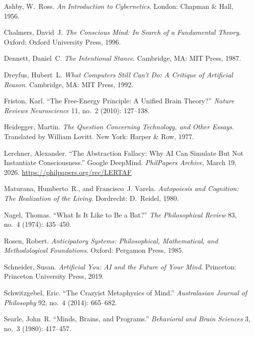 \documentclass[11pt]{article}
\theoremstyle{definition}
\theoremstyle{remark}
\begin{document}
{\setlength{\parskip}{4pt}\noindent
Ashby, W.~Ross. \textit{An Introduction to Cybernetics}. London: Chapman \& Hall, 1956.

\medskip\noindent
Chalmers, David~J. \textit{The Conscious Mind: In Search of a Fundamental Theory}. Oxford:
Oxford University Press, 1996.

\medskip\noindent
Dennett, Daniel~C. \textit{The Intentional Stance}. Cambridge, MA: MIT Press, 1987.

\medskip\noindent
Dreyfus, Hubert~L. \textit{What Computers Still Can't Do: A Critique of Artificial Reason}.
Cambridge, MA: MIT Press, 1992.

\medskip\noindent
Friston, Karl. ``The Free-Energy Principle: A Unified Brain Theory?'' \textit{Nature Reviews
Neuroscience} 11, no.~2 (2010): 127--138.

\medskip\noindent
Heidegger, Martin. \textit{The Question Concerning Technology, and Other Essays}. Translated
by William Lovitt. New York: Harper \& Row, 1977.

\medskip\noindent
Lerchner, Alexander. ``The Abstraction Fallacy: Why AI Can Simulate But Not Instantiate
Consciousness.'' Google DeepMind. \textit{PhilPapers Archive}, March 19, 2026.
\url{https://philpapers.org/rec/LERTAF}

\medskip\noindent
Maturana, Humberto~R., and Francisco~J. Varela. \textit{Autopoiesis and Cognition: The
Realization of the Living}. Dordrecht: D.~Reidel, 1980.

\medskip\noindent
Nagel, Thomas. ``What Is It Like to Be a Bat?'' \textit{The Philosophical Review} 83,
no.~4 (1974): 435--450.

\medskip\noindent
Rosen, Robert. \textit{Anticipatory Systems: Philosophical, Mathematical, and Methodological
Foundations}. Oxford: Pergamon Press, 1985.

\medskip\noindent
Schneider, Susan. \textit{Artificial You: AI and the Future of Your Mind}. Princeton:
Princeton University Press, 2019.

\medskip\noindent
Schwitzgebel, Eric. ``The Crazyist Metaphysics of Mind.'' \textit{Australasian Journal of
Philosophy} 92, no.~4 (2014): 665--682.

\medskip\noindent
Searle, John~R. ``Minds, Brains, and Programs.'' \textit{Behavioral and Brain Sciences}
3, no.~3 (1980): 417--457.
}

\end{document}
